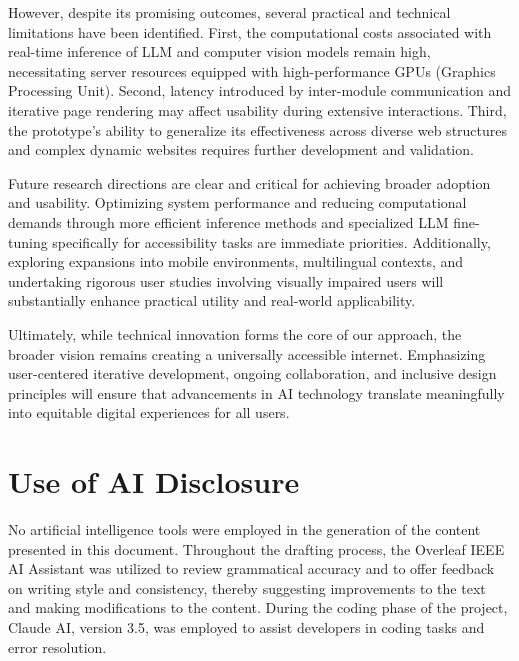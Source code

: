 \documentclass[conference]{IEEEtran}
\begin{document}
However, despite its promising outcomes, several practical and technical limitations have been identified. First, the computational costs associated with real-time inference of LLM and computer vision models remain high, necessitating server resources equipped with high-performance GPUs (Graphics Processing Unit). Second, latency introduced by inter-module communication and iterative page rendering may affect usability during extensive interactions. Third, the prototype's ability to generalize its effectiveness across diverse web structures and complex dynamic websites requires further development and validation.

Future research directions are clear and critical for achieving broader adoption and usability. Optimizing system performance and reducing computational demands through more efficient inference methods and specialized LLM fine-tuning specifically for accessibility tasks are immediate priorities. Additionally, exploring expansions into mobile environments, multilingual contexts, and undertaking rigorous user studies involving visually impaired users will substantially enhance practical utility and real-world applicability.

Ultimately, while technical innovation forms the core of our approach, the broader vision remains creating a universally accessible internet. Emphasizing user-centered iterative development, ongoing collaboration, and inclusive design principles will ensure that advancements in AI technology translate meaningfully into equitable digital experiences for all users.


\section{Use of AI Disclosure}
No artificial intelligence tools were employed in the generation of the content presented in this document. Throughout the drafting process, the Overleaf IEEE AI Assistant was utilized to review grammatical accuracy and to offer feedback on writing style and consistency, thereby suggesting improvements to the text and making modifications to the content. During the coding phase of the project, Claude AI, version 3.5, was employed to assist developers in coding tasks and error resolution.




\end{document}
